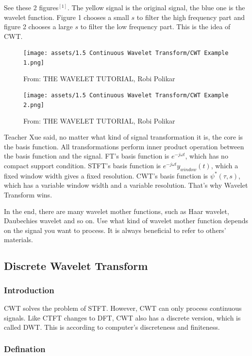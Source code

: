 \documentclass[12pt]{ctexart}
\begin{document}
See these 2 figures$^{[1]}$. The yellow signal is the original signal, the blue one is the wavelet
function. Figure 1 chooses a small $s$ to filter the high frequency part and figure 2
chooses a large $s$ to filter the low frequency part. This is the idea of CWT.

\begin{figure}[H]
  \centering
  \texttt{[image: assets/1.5 Continuous Wavelet Transform/CWT
  Example 1.png]}
  \caption{From: THE WAVELET TUTORIAL, Robi Polikar}
\end{figure}
\begin{figure}[H]
  \centering
  \texttt{[image: assets/1.5 Continuous Wavelet Transform/CWT
  Example 2.png]}
  \caption{From: THE WAVELET TUTORIAL, Robi Polikar}
\end{figure}

Teacher Xue said, no matter what kind of signal transformation it is, the core is the
basis function. All transformations perform inner product operation between the basis
function and the signal. FT's basis function is $e^{-j\omega t}$, which has no compact
support condition. STFT's basis function is $e^{-j\omega t}y_{window}(t)$, which a fixed
window width gives a fixed resolution. CWT's basis function is $\psi^*(\tau,s)$, which has
a variable window width and a variable resolution. That's why Wavelet Transform wins.

In the end, there are many wavelet mother functions, such as Haar wavelet, Daubechies
wavelet and so on. Use what kind of wavelet mother function depends on the signal
you want to process. It is always beneficial to refer to others' materials.

\subsection{\textbf{Discrete Wavelet Transform}}

\subsubsection{\textbf{Introduction}}

CWT solves the problem of STFT. However, CWT can only process continuous signals.
Like CTFT changes to DFT, CWT also has a discrete version, which is called DWT.
This is according to computer's discreteness and finiteness.

\subsubsection{\textbf{Defination}}
\end{document}

